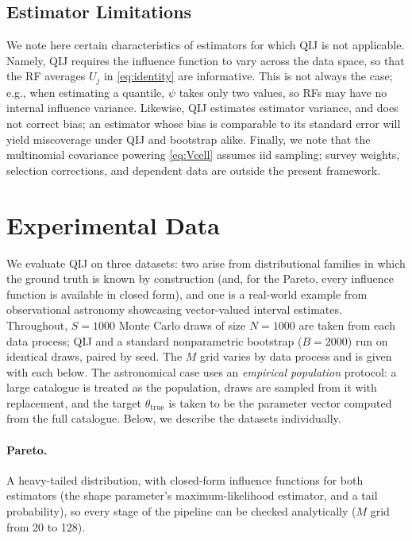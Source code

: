 \documentclass[runningheads]{llncs}
\newcommand{\ifl}{\psi}
\begin{document}
\subsection{Estimator Limitations}\label{sec:scope}

We note here certain characteristics of estimators for which QIJ is not applicable. Namely, QIJ requires the influence function to vary across the data space, so that the RF averages $U_j$ in \eqref{eq:identity} are informative. This is not always the case; e.g., when estimating a quantile, $\ifl$ takes only two values, so RFs may have no internal influence variance. Likewise, QIJ estimates estimator variance, and does not correct bias; an estimator whose bias is comparable to its standard error will yield miscoverage under QIJ and bootstrap alike. Finally, we note that the multinomial covariance powering \eqref{eq:Vcell} assumes iid sampling; survey weights, selection corrections, and dependent data are outside the present framework.


\section{Experimental Data}\label{sec:data}

We evaluate QIJ on three datasets: two arise from distributional families in which the ground truth is known by construction (and, for the Pareto, every influence function is available in closed form), and one is a real-world example from observational astronomy showcasing vector-valued interval estimates. Throughout, $S=1000$ Monte Carlo draws of size $N = 1000$ are taken from each data process; QIJ and a standard nonparametric bootstrap ($B = 2000$) run on identical draws, paired by seed. The $M$ grid varies by data process and is given with each below. The astronomical case uses an \emph{empirical population} protocol: a large catalogue is treated as the population, draws are sampled from it with replacement, and the target $\theta_{\mathrm{true}}$ is taken to be the parameter vector computed from the full catalogue. Below, we describe the datasets individually.

\paragraph{Pareto.} A heavy-tailed distribution, with closed-form influence functions for both estimators (the shape parameter's maximum-likelihood estimator, and a tail probability), so every stage of the pipeline can be checked analytically ($M$ grid from 20 to 128).
\end{document}
